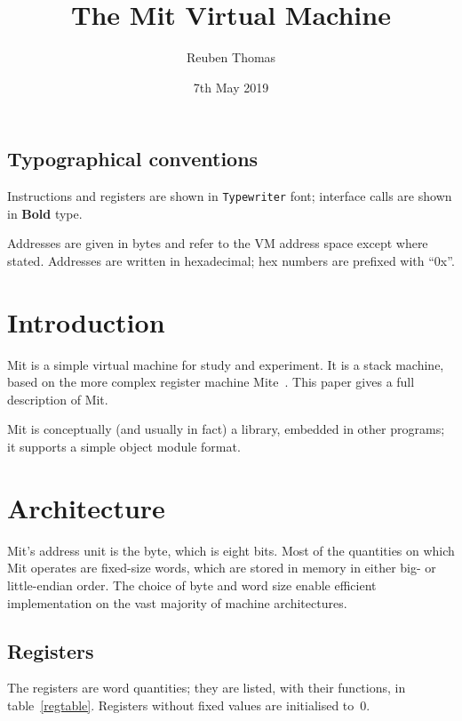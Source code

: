 \documentclass[a4paper]{article}
\title{The Mit Virtual Machine}
\author{Reuben Thomas}
\date{7th May 2019}
\begin{document}
\maketitle

\subsection*{Typographical conventions}

Instructions and registers are shown in {\tt Typewriter} font;
interface calls are shown in {\bf Bold} type.

Addresses are given in bytes and refer to the VM address space except where
stated. Addresses are written in hexadecimal; hex numbers are prefixed with
“0x”.


\section{Introduction}

Mit is a simple virtual machine for study and experiment. It is a stack machine, based on the more complex register machine Mite~\cite{mite0}.
This paper gives a full description of Mit.

Mit is conceptually (and usually in fact) a library, embedded in other programs; it supports a simple object module format.


\section{Architecture}

Mit's address unit is the byte, which is eight bits.
Most of the quantities on which Mit operates are fixed-size words, which are stored in memory in either big- or little-endian order.
The choice of byte and word size enable efficient implementation on the vast majority of machine architectures.


\subsection{Registers}
\label{registers}

The registers are word quantities; they are listed, with their functions, in table~\ref{regtable}. Registers without fixed values are initialised to~$0$.
\end{document}
